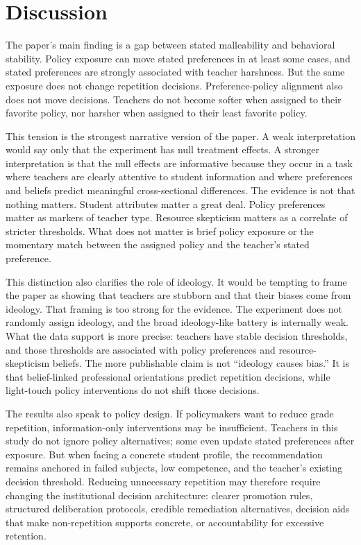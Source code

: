 \documentclass[12pt,a4paper]{article}
\begin{document}
\section{Discussion}

The paper's main finding is a gap between stated malleability and behavioral stability. Policy exposure can move stated preferences in at least some cases, and stated preferences are strongly associated with teacher harshness. But the same exposure does not change repetition decisions. Preference-policy alignment also does not move decisions. Teachers do not become softer when assigned to their favorite policy, nor harsher when assigned to their least favorite policy.

This tension is the strongest narrative version of the paper. A weak interpretation would say only that the experiment has null treatment effects. A stronger interpretation is that the null effects are informative because they occur in a task where teachers are clearly attentive to student information and where preferences and beliefs predict meaningful cross-sectional differences. The evidence is not that nothing matters. Student attributes matter a great deal. Policy preferences matter as markers of teacher type. Resource skepticism matters as a correlate of stricter thresholds. What does not matter is brief policy exposure or the momentary match between the assigned policy and the teacher's stated preference.

This distinction also clarifies the role of ideology. It would be tempting to frame the paper as showing that teachers are stubborn and that their biases come from ideology. That framing is too strong for the evidence. The experiment does not randomly assign ideology, and the broad ideology-like battery is internally weak. What the data support is more precise: teachers have stable decision thresholds, and those thresholds are associated with policy preferences and resource-skepticism beliefs. The more publishable claim is not ``ideology causes bias.'' It is that belief-linked professional orientations predict repetition decisions, while light-touch policy interventions do not shift those decisions.

The results also speak to policy design. If policymakers want to reduce grade repetition, information-only interventions may be insufficient. Teachers in this study do not ignore policy alternatives; some even update stated preferences after exposure. But when facing a concrete student profile, the recommendation remains anchored in failed subjects, low competence, and the teacher's existing decision threshold. Reducing unnecessary repetition may therefore require changing the institutional decision architecture: clearer promotion rules, structured deliberation protocols, credible remediation alternatives, decision aids that make non-repetition supports concrete, or accountability for excessive retention.
\end{document}
